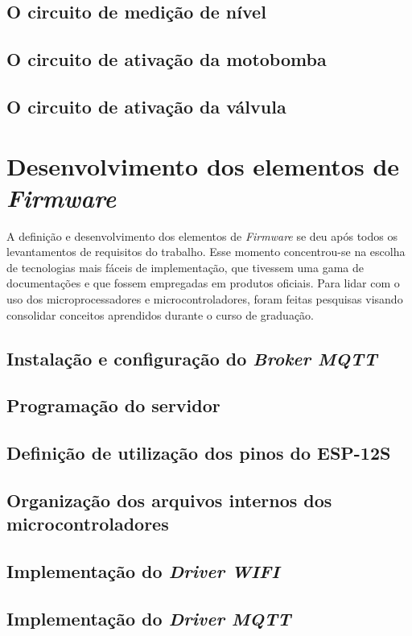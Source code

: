 \subsection{O circuito de medição de nível}
\subsection{O circuito de ativação da motobomba}
\subsection{O circuito de ativação da válvula}

\section{Desenvolvimento dos elementos de \textit{Firmware}}
\label{sec: dev_ele_fw}

A definição e desenvolvimento dos elementos de \textit{Firmware} se deu após todos os levantamentos de requisitos do trabalho. Esse momento concentrou-se na escolha de tecnologias mais fáceis de implementação, que tivessem uma gama de documentações e que fossem empregadas em produtos oficiais. Para lidar com o uso dos microprocessadores e microcontroladores, foram feitas pesquisas visando consolidar conceitos aprendidos durante o curso de graduação.

\subsection {Instalação e configuração do \textit{Broker MQTT}}
\subsection {Programação do servidor}
\subsection {Definição de utilização dos pinos do ESP-12S}
\subsection{Organização dos arquivos internos dos microcontroladores}
\subsection {Implementação do \textit{Driver WIFI}}
\subsection {Implementação do \textit{Driver MQTT}}
